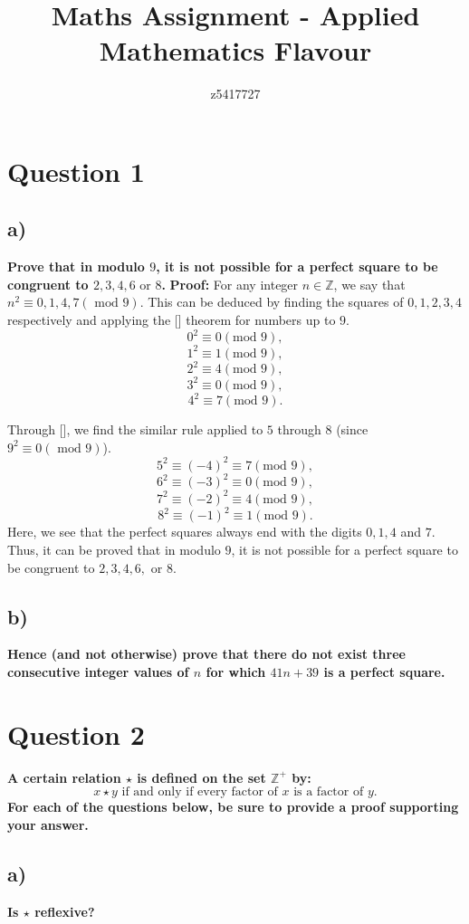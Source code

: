 \documentclass{article}
\title{Maths Assignment - Applied Mathematics Flavour}
\author{z5417727}
\begin{document}
\maketitle
{\LARGE \tableofcontents}
\newpage
\section{Question 1}
\subsection{a)}
\textbf{ Prove that in modulo $9$, it is not possible for a perfect square to be congruent to $2, 3, 4, 6 \text{ or } 8$.}
\textbf{ Proof: } For any integer $n \in \mathbb{Z}$, we say that $n^2 \equiv 0, 1, 4, 7 (\text{ mod } 9).$ 
\newline
\newline
This can be deduced by finding the squares of $0, 1, 2, 3, 4$ respectively and applying the [] theorem for numbers up to $9$.
$$0^2 \equiv 0 (\text{mod }9),$$
$$1^2 \equiv 1 (\text{mod }9),$$
$$2^2 \equiv 4 (\text{mod }9),$$
$$3^2 \equiv 0 (\text{mod }9),$$
$$4^2 \equiv 7 (\text{mod }9).$$

Through [], we find the similar rule applied to $5$ through $8$ (since $9^2 \equiv 0 (\text{ mod } 9)$).
$$5^2 \equiv (-4)^2 \equiv 7 (\text{mod }9),$$
$$6^2 \equiv (-3)^2 \equiv 0 (\text{mod }9),$$
$$7^2 \equiv (-2)^2 \equiv 4 (\text{mod }9),$$
$$8^2 \equiv (-1)^2 \equiv 1 (\text{mod }9).$$
Here, we see that the perfect squares always end with the digits $0, 1, 4$ and $7$. Thus, it can be proved that in modulo $9$, it is not possible for a perfect square to be congruent to $2, 3, 4, 6, \text{ or } 8$.
\newpage
\subsection{b)}
\textbf{ Hence (and not otherwise) prove that there do not exist three consecutive integer values of $n$ for which $41n + 39$ is a perfect square. }
\newpage
\section{Question 2}
\textbf{ A certain relation $\star$ is defined on the set $\mathbb{Z}^+$ by:
\newline
$$x \star y \text{ if and only if every factor of } x \text{ is a factor of } y.$$
For each of the questions below, be sure to provide a proof supporting your answer. }
\subsection{a)}
\textbf{ Is $\star $ reflexive? }
\newpage
\end{document}
